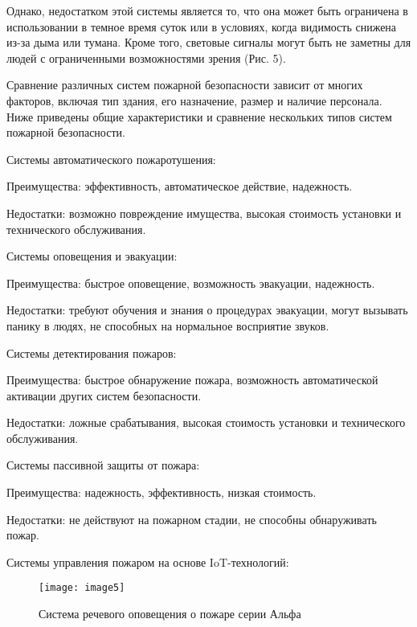 \begin{multicols}{2}
Однако, недостатком этой системы является то, что она может быть
ограничена в использовании в темное время суток или в условиях, когда
видимость снижена из-за дыма или тумана. Кроме того, световые сигналы
могут быть не заметны для людей с ограниченными возможностями зрения
(Рис. 5).

Сравнение различных систем пожарной безопасности зависит от многих
факторов, включая тип здания, его назначение, размер и наличие
персонала. Ниже приведены общие характеристики и сравнение нескольких
типов систем пожарной безопасности.

Системы автоматического пожаротушения:

Преимущества: эффективность, автоматическое действие, надежность.

Недостатки: возможно повреждение имущества, высокая стоимость установки
и технического обслуживания.

Системы оповещения и эвакуации:

Преимущества: быстрое оповещение, возможность эвакуации, надежность.

Недостатки: требуют обучения и знания о процедурах эвакуации, могут
вызывать панику в людях, не способных на нормальное восприятие звуков.

Системы детектирования пожаров:

Преимущества: быстрое обнаружение пожара, возможность автоматической
активации других систем безопасности.

Недостатки: ложные срабатывания, высокая стоимость установки и
технического обслуживания.

Системы пассивной защиты от пожара:

Преимущества: надежность, эффективность, низкая стоимость.

Недостатки: не действуют на пожарном стадии, не способны обнаруживать
пожар.

Системы управления пожаром на основе IoT-технологий:

\end{multicols}

\begin{figure}[H]
  \centering
  \texttt{[image: image5]}
  \caption{Система речевого оповещения о пожаре серии Альфа}
\end{figure}

